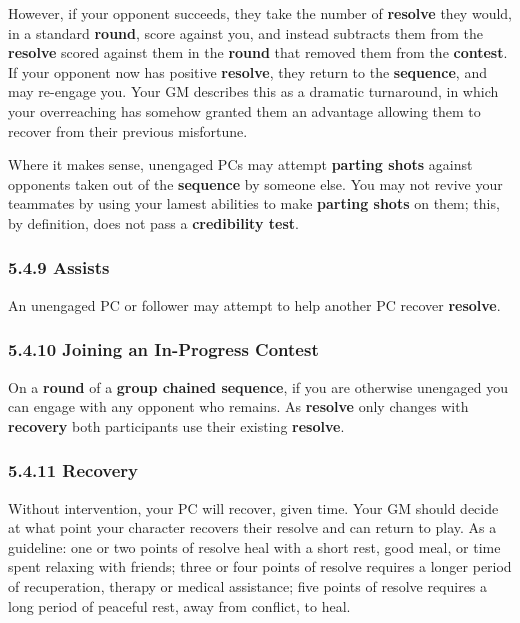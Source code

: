 \documentclass[
  11pt,
]{article}
\begin{document}
However, if your opponent succeeds, they take the number of
\textbf{resolve} they would, in a standard \textbf{round}, score against
you, and instead subtracts them from the \textbf{resolve} scored against
them in the \textbf{round} that removed them from the \textbf{contest}.
If your opponent now has positive \textbf{resolve}, they return to the
\textbf{sequence}, and may re-engage you. Your GM describes this as a
dramatic turnaround, in which your overreaching has somehow granted them
an advantage allowing them to recover from their previous misfortune.

Where it makes sense, unengaged PCs may attempt \textbf{parting shots}
against opponents taken out of the \textbf{sequence} by someone else.
You may not revive your teammates by using your lamest abilities to make
\textbf{parting shots} on them; this, by definition, does not pass a
\textbf{credibility test}.

\hypertarget{assists-3}{%
\subsubsection{5.4.9 Assists}\label{assists-3}}

An unengaged PC or follower may attempt to help another PC recover
\textbf{resolve}.

\hypertarget{joining-an-in-progress-contest-3}{%
\subsubsection{5.4.10 Joining an In-Progress
Contest}\label{joining-an-in-progress-contest-3}}

On a \textbf{round} of a \textbf{group chained sequence}, if you are
otherwise unengaged you can engage with any opponent who remains. As
\textbf{resolve} only changes with \textbf{recovery} both participants
use their existing \textbf{resolve}.

\hypertarget{recovery-1}{%
\subsubsection{5.4.11 Recovery}\label{recovery-1}}

Without intervention, your PC will recover, given time. Your GM should
decide at what point your character recovers their resolve and can
return to play. As a guideline: one or two points of resolve heal with a
short rest, good meal, or time spent relaxing with friends; three or
four points of resolve requires a longer period of recuperation, therapy
or medical assistance; five points of resolve requires a long period of
peaceful rest, away from conflict, to heal.
\end{document}
